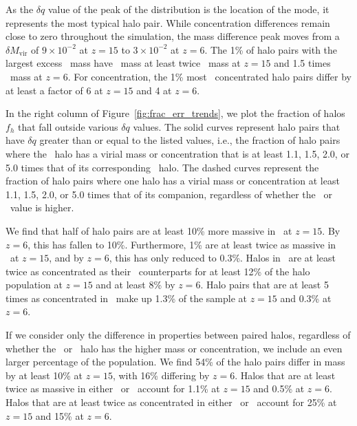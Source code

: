 As the $\delta q$ value of the peak of the distribution is the location of the mode, it represents the most typical halo pair.  While concentration differences remain close to zero throughout the simulation, the mass difference peak moves from a $\delta M_{\mathrm{vir}}$ of $9 \times 10^{-2}$ at $z = 15$ to $3 \times 10^{-2}$ at $z = 6$.  The 1\% of halo pairs with the largest excess \lpt\ mass have \lpt\ mass at least twice \za\ mass at $z = 15$ and 1.5 times \za\ mass at $z = 6$.  For concentration, the 1\% most \lpt\ concentrated halo pairs differ by at least a factor of 6 at $z = 15$ and 4 at $z = 6$.

In the right column of Figure~\ref{fig:frac_err_trends}, we plot the fraction of halos $f_{h}$ that fall outside various $\delta q$ values.  The solid curves represent halo pairs that have $\delta q$ greater than or equal to the listed values, i.e., the fraction of halo pairs where the \lpt\ halo has a virial mass or concentration that is at least 1.1, 1.5, 2.0, or 5.0 times that of its corresponding \za\ halo.  The dashed curves represent the fraction of halo pairs where one halo has a virial mass or concentration at least 1.1, 1.5, 2.0, or 5.0 times that of its companion, regardless of whether the \lpt\ or \za\ value is higher.

We find that half of halo pairs are at least 10\% more massive in \lpt\ at $z = 15$.  By $z = 6$, this has fallen to 10\%.  Furthermore, 1\% are at least twice as massive in \lpt\ at $z = 15$, and by $z = 6$, this has only reduced to 0.3\%.  Halos in \lpt\ are at least twice as concentrated as their \za\ counterparts for at least 12\% of the halo population at $z = 15$ and at least 8\% by $z = 6$.  Halo pairs that are at least 5 times as concentrated in \lpt\ make up 1.3\% of the sample at $z = 15$ and 0.3\% at $z = 6$.

If we consider only the difference in properties between paired halos, regardless of whether the \lpt\ or \za\ halo has the higher mass or concentration, we include an even larger percentage of the population.   We find 54\% of the halo pairs differ in mass by at least 10\% at $z = 15$, with 16\% differing by $z = 6$.  Halos that are at least twice as massive in either \lpt\ or \za\ account for 1.1\% at $z = 15$ and 0.5\% at $z = 6$.  Halos that are at least twice as concentrated in either \lpt\ or \za\ account for 25\% at $z = 15$ and 15\% at $z = 6$.




